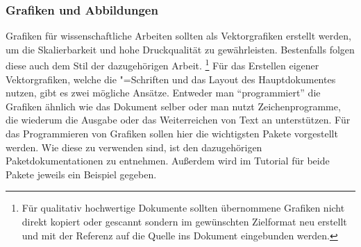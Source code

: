 \subsubsection{Grafiken und Abbildungen}
%
Grafiken für wissenschaftliche Arbeiten sollten als Vektorgrafiken erstellt 
werden, um die Skalierbarkeit und hohe Druckqualität zu gewährleisten. 
Bestenfalls folgen diese auch dem Stil der dazugehörigen Arbeit.%
\footnote{%
  Für qualitativ hochwertige Dokumente sollten übernommene Grafiken nicht 
  direkt kopiert oder gescannt sondern im gewünschten Zielformat neu erstellt 
  und mit der Referenz auf die Quelle ins Dokument eingebunden werden.
}
Für das Erstellen eigener Vektorgrafiken, welche die "=Schriften 
und das Layout des Hauptdokumentes nutzen, gibt es zwei mögliche Ansätze. 
Entweder man \enquote{programmiert} die Grafiken ähnlich wie das Dokument 
selber oder man nutzt Zeichenprogramme, die wiederum die Ausgabe oder das 
Weiterreichen von Text an  unterstützen. Für das Programmieren 
von Grafiken sollen hier die wichtigsten Pakete vorgestellt werden. Wie diese 
zu verwenden sind, ist den dazugehörigen Paketdokumentationen zu entnehmen. 
Außerdem wird im Tutorial  für beide Pakete jeweils ein 
Beispiel gegeben.

